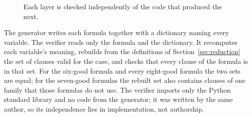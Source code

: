 \documentclass[11pt,a4paper]{article}
\theoremstyle{remark}
\begin{document}
\begin{figure}[H]
\centering
{}
\caption{Each layer is checked independently of the code that produced the next.}
\end{figure}

The generator writes each formula together with a dictionary naming every variable. The verifier reads only the formula and the dictionary. It recomputes each variable's meaning, rebuilds from the definitions of Section~\ref{sec:reduction} the set of clauses valid for the case, and checks that every clause of the formula is in that set. For the six-good formula and every eight-good formula the two sets are equal; for the seven-good formulas the rebuilt set also contains clauses of one family that those formulas do not use. The verifier imports only the Python standard library and no code from the generator; it was written by the same author, so its independence lies in implementation, not authorship.
\end{document}

